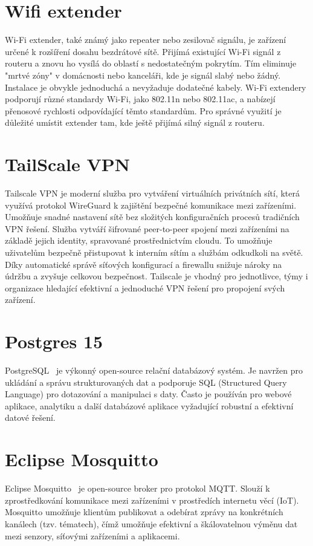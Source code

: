 \section{Wifi extender}\label{sec:wifi-extender}
Wi-Fi extender, také známý jako repeater nebo zesilovač signálu, je zařízení určené k rozšíření dosahu bezdrátové sítě.
Přijímá existující Wi-Fi signál z routeru a znovu ho vysílá do oblastí s nedostatečným pokrytím.
Tím eliminuje "mrtvé zóny" v domácnosti nebo kanceláři, kde je signál slabý nebo žádný.
Instalace je obvykle jednoduchá a nevyžaduje dodatečné kabely.
Wi-Fi extendery podporují různé standardy Wi-Fi, jako 802.11n nebo 802.11ac, a nabízejí přenosové rychlosti odpovídající těmto standardům.
Pro správné využití je důležité umístit extender tam, kde ještě přijímá silný signál z routeru.

\section{TailScale VPN}\label{sec:tailscale}
Tailscale VPN je moderní služba pro vytváření virtuálních privátních sítí, která využívá protokol WireGuard k zajištění bezpečné komunikace mezi zařízeními.
Umožňuje snadné nastavení sítě bez složitých konfiguračních procesů tradičních VPN řešení.
Služba vytváří šifrované peer-to-peer spojení mezi zařízeními na základě jejich identity, spravované prostřednictvím cloudu.
To umožňuje uživatelům bezpečně přistupovat k interním sítím a službám odkudkoli na světě.
Díky automatické správě síťových konfigurací a firewallu snižuje nároky na údržbu a zvyšuje celkovou bezpečnost.
Tailscale je vhodný pro jednotlivce, týmy i organizace hledající efektivní a jednoduché VPN řešení pro propojení svých zařízení.

\section{Postgres 15}\label{sec:postgres-15}
PostgreSQL~\cite{PostgreSQL15Documentation} je výkonný open-source relační databázový systém.
Je navržen pro ukládání a správu strukturovaných dat a podporuje SQL (Structured Query Language) pro dotazování a manipulaci s daty.
Často je používán pro webové aplikace, analytiku a další databázové aplikace vyžadující robustní a efektivní datové řešení.

\section{Eclipse Mosquitto}\label{sec:eclipse-mosquitto}
Eclipse Mosquitto~\cite{EclipseMosquitto} je open-source broker pro protokol MQTT.
Slouží k zprostředkování komunikace mezi zařízeními v prostředích internetu věcí (IoT).
Mosquitto umožňuje klientům publikovat a odebírat zprávy na konkrétních kanálech (tzv. tématech), čímž umožňuje efektivní a škálovatelnou výměnu dat mezi senzory, síťovými zařízeními a aplikacemi.

